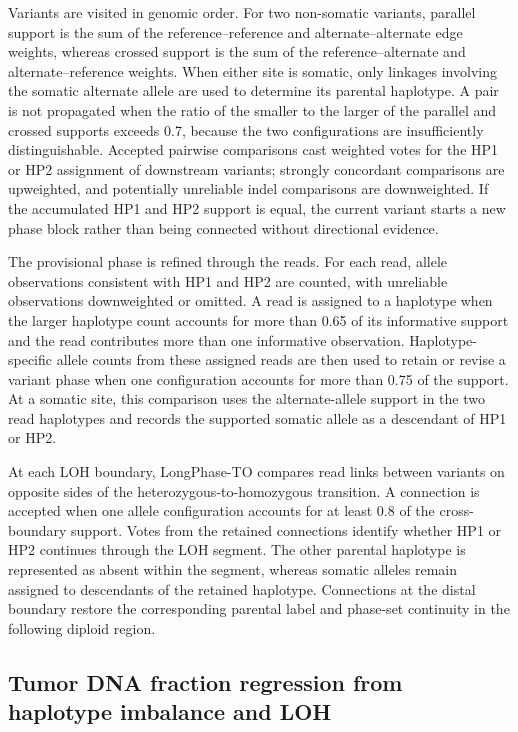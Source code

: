 \documentclass[pdflatex,sn-nature]{sn-jnl}
\begin{document}
Variants are visited in genomic order. For two non-somatic variants, parallel support is the sum of the reference--reference and alternate--alternate edge weights, whereas crossed support is the sum of the reference--alternate and alternate--reference weights. When either site is somatic, only linkages involving the somatic alternate allele are used to determine its parental haplotype. A pair is not propagated when the ratio of the smaller to the larger of the parallel and crossed supports exceeds 0.7, because the two configurations are insufficiently distinguishable. Accepted pairwise comparisons cast weighted votes for the HP1 or HP2 assignment of downstream variants; strongly concordant comparisons are upweighted, and potentially unreliable indel comparisons are downweighted. If the accumulated HP1 and HP2 support is equal, the current variant starts a new phase block rather than being connected without directional evidence.

The provisional phase is refined through the reads. For each read, allele observations consistent with HP1 and HP2 are counted, with unreliable observations downweighted or omitted. A read is assigned to a haplotype when the larger haplotype count accounts for more than 0.65 of its informative support and the read contributes more than one informative observation. Haplotype-specific allele counts from these assigned reads are then used to retain or revise a variant phase when one configuration accounts for more than 0.75 of the support. At a somatic site, this comparison uses the alternate-allele support in the two read haplotypes and records the supported somatic allele as a descendant of HP1 or HP2.

At each LOH boundary, LongPhase-TO compares read links between variants on opposite sides of the heterozygous-to-homozygous transition. A connection is accepted when one allele configuration accounts for at least 0.8 of the cross-boundary support. Votes from the retained connections identify whether HP1 or HP2 continues through the LOH segment. The other parental haplotype is represented as absent within the segment, whereas somatic alleles remain assigned to descendants of the retained haplotype. Connections at the distal boundary restore the corresponding parental label and phase-set continuity in the following diploid region.

\subsection{Tumor DNA fraction regression from haplotype imbalance and LOH}
\label{app:dna-fraction-regression}
\end{document}
